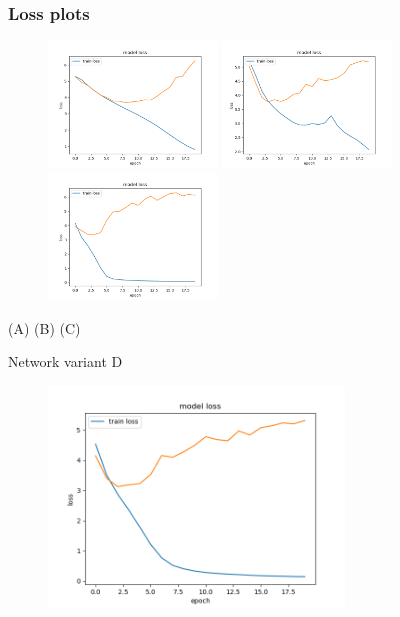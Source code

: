 \documentclass{beamer}
\begin{document}
\begin{frame}
\frametitle{Loss plots}
\centering
\begin{figure}[!h]
\centering
\begin{adjustwidth}{-.4in}{-.4in}
  \includegraphics[width=0.4\textwidth]{images/run1_loss_a.png}
  \includegraphics[width=0.4\textwidth]{images/run1_loss_b.png}
  \includegraphics[width=0.4\textwidth]{images/run1_loss_c.png}
\end{adjustwidth}
\end{figure}
(A) \hspace{3.5cm} (B) \hspace{3.5cm} (C)
\end{frame}

\begin{frame}
\centering
Network variant D
\begin{figure}[!h]
\centering
\includegraphics[width=0.7\textwidth]{images/run1_loss_d.png}
\end{figure}
\end{frame}
\end{document}
